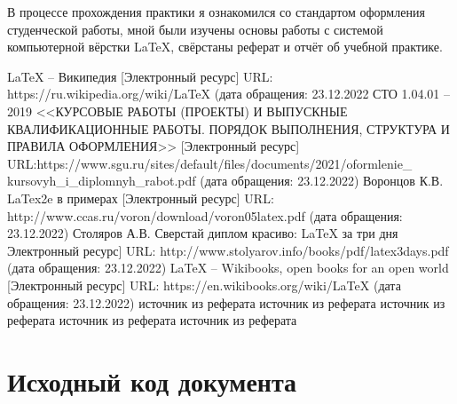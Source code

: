 \documentclass[bachelor, och, pract]{SCWorks}
\begin{document}
\conclusion
В процессе прохождения практики я ознакомился со стандартом оформления студенческой работы, мной были изучены основы работы с системой компьютерной вёрстки \LaTeX,  свёрстаны реферат и отчёт об учебной практике.

%
\begin{thebibliography}{99}

  LaTeX -- Википедия [Электронный ресурс] URL: https://ru.wikipedia.org/wiki/LaTeX (дата обращения: 23.12.2022
  \label{1}
  СТО 1.04.01 -- 2019 <<КУРСОВЫЕ РАБОТЫ (ПРОЕКТЫ) И ВЫПУСКНЫЕ КВАЛИФИКАЦИОННЫЕ РАБОТЫ. ПОРЯДОК ВЫПОЛНЕНИЯ, СТРУКТУРА И ПРАВИЛА ОФОРМЛЕНИЯ>> [Электронный ресурс] URL:https://www.sgu.ru/sites/default/files/documents/2021/oformlenie\_\\kursovyh\_i\_diplomnyh\_rabot.pdf (дата обращения: 23.12.2022)
  \label{2}
  Воронцов К.В. LaTex2e в примерах [Электронный ресурс] URL: http://www.ccas.ru/voron/download/voron05latex.pdf (дата обращения: 23.12.2022)
  \label{3}
  Столяров А.В. Сверстай диплом красиво: LaTeX за три дня Электронный ресурс] URL: http://www.stolyarov.info/books/pdf/latex3days.pdf (дата обращения: 23.12.2022)
  \label{4}
  LaTeX  -- Wikibooks, open books for an open world [Электронный ресурс] URL: https://en.wikibooks.org/wiki/LaTeX (дата обращения: 23.12.2022)
  \label{5}
 источник из реферата
  \label{6}
 источник из реферата
  \label{7}
 источник из реферата
  \label{8}
 источник из реферата
  \label{9}
 источник из реферата
   \label{10}
 
\end{thebibliography}

%
%
%

\appendix

\section{Исходный код документа}
\end{document}
